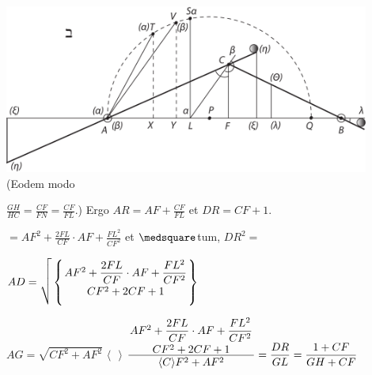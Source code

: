 \pend
\newpage
\pstart
\centering \includegraphics[width=0.9\textwidth]{images/LH037,03_078v-d2.pdf}\\
\pend
\vspace{1.5em}
\pstart \noindent
{}(Eodem modo \rule[-4mm]{0mm}{10mm}$\displaystyle\frac{GH}{HC}=\frac{CF}{FN}=\frac{CF}{FL}.$)
Ergo $\displaystyle AR=AF+\frac{CF}{FL}$ et $DR=CF+1.$
\rule[-4mm]{0mm}{10mm}$\displaystyle=AF^{2}+\frac{2FL}{CF}\cdot AF+\frac{FL^{2}}{CF^{2}}$ et $\medsquare$tum, $DR^{2}=$ 
\rule[-4mm]{0mm}{10mm}$AD=\sqrt{\vphantom{\mathstrut \left\{AF^{2} + \displaystyle\frac{2FL}{CF} \cdot AF + \displaystyle\frac{FL^{2}}{CF^{2}} \atop CF^{2} + 2CF + 1 \right\}}} \displaystyle\left\{AF^{2} + \displaystyle\frac{2FL}{CF} \cdot AF + \displaystyle\frac{FL^{2}}{CF^{2}} \atop CF^{2} + 2CF + 1 \right\}$ \quad
\rule[-4mm]{0mm}{10mm}$AG=\sqrt{CF^{2} + AF^{2}}$ 
$\langle$\,\textendash\,\textendash\,\textendash\,$\rangle$
$\displaystyle\frac{\displaystyle\efrac{AF^{2} + \displaystyle\frac{2FL}{CF} \cdot AF + \displaystyle\frac{FL^{2}}{CF^{2}}}{CF^{2} + 2CF + 1}}{\langle C\rangle F^{2}+AF^{2}}=\frac{DR}{GL}=\frac{1+CF}{GH+CF}$
